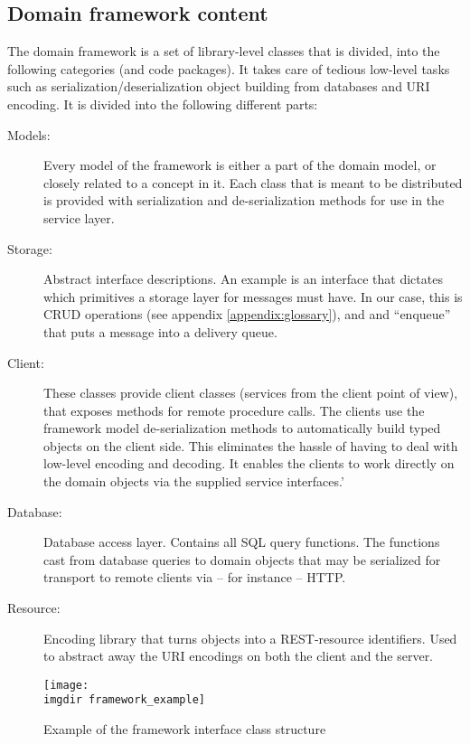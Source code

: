\subsection{Domain framework content}
\label{ssec:openreception-framework-content}
\noindent
The domain framework is a set of library-level classes that is divided, into the following categories (and code packages). It takes care of tedious low-level tasks such as serialization/deserialization object building from databases and URI encoding. It is divided into the following different parts:
\begin{description}

  \item[Models:] Every model of the framework is either a part of the domain model, or closely related to a concept in it. Each class that is meant to be distributed is provided with serialization and de-serialization methods for use in the service layer.
  
  \item[Storage:] Abstract interface descriptions. An example is an interface that dictates which primitives a storage layer for messages must have. In our case, this is CRUD operations (see appendix \ref{appendix:glossary}), and and ``enqueue'' that puts a message into a delivery queue.
  
  \item[Client:] These classes provide client classes (services from the client point of view), that exposes methods for remote procedure calls. The clients use  the framework model de-serialization methods to automatically build typed objects on the client side. This eliminates the hassle of having to deal with low-level encoding and decoding. It enables the clients to work directly on the domain objects via the supplied service interfaces.'
  
  \item[Database:] Database access layer. Contains all SQL query functions. The functions cast from database queries to domain objects that may be serialized for transport to remote clients via -- for instance -- HTTP.
  
  \item[Resource:] Encoding library that turns objects into a REST-resource identifiers. Used to abstract away the URI encodings on both the client and the server.
  
\end{description}
\begin{figure}[!htbp]
\texttt{[image: \\imgdir framework\_example]}
\centering
\caption{Example of the framework interface class structure}
\label{fig:framework_example}
\end{figure}
